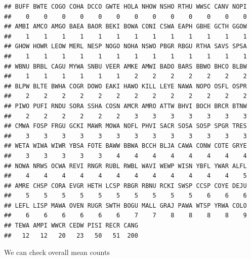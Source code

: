 \documentclass[12pt,]{book}
\newenvironment{Shaded}{\begin{snugshade}}{\end{snugshade}}
\newcommand{\DecValTok}[1]{\textcolor[rgb]{0.00,0.00,0.81}{#1}}
\newcommand{\KeywordTok}[1]{\textcolor[rgb]{0.13,0.29,0.53}{\textbf{#1}}}
\newcommand{\NormalTok}[1]{#1}
\newcommand{\OperatorTok}[1]{\textcolor[rgb]{0.81,0.36,0.00}{\textbf{#1}}}
\newcommand{\StringTok}[1]{\textcolor[rgb]{0.31,0.60,0.02}{#1}}
\begin{document}
\begin{verbatim}
## BUFF BWTE COGO COHA DCCO GWTE HOLA NHOW NSHO RTHU WWSC CANV NOPI 
##    0    0    0    0    0    0    0    0    0    0    0    0    0 
## AMBI AMCO AMGO BAEA BAOR BEKI BOWA CONI CSWA EAPH GBHE GCTH GGOW 
##    1    1    1    1    1    1    1    1    1    1    1    1    1 
## GHOW HOWR LEOW MERL NESP NOGO NOHA NSWO PBGR RBGU RTHA SAVS SPSA 
##    1    1    1    1    1    1    1    1    1    1    1    1    1 
## WBNU BRBL CAGU MYWA SNBU VEER AMKE AMWI BADO BARS BBWO BHCO BLBW 
##    1    1    1    1    1    1    2    2    2    2    2    2    2 
## BLPW BLTE BWHA COGR DOWO EAKI HAWO KILL LEYE NAWA NOPO OSFL OSPR 
##    2    2    2    2    2    2    2    2    2    2    2    2    2 
## PIWO PUFI RNDU SORA SSHA COSN AMCR AMRO ATTW BHVI BOCH BRCR BTNW 
##    2    2    2    2    2    2    3    3    3    3    3    3    3 
## CMWA FOSP FRGU GCKI MAWR MOWA NOFL PHVI SACR SOSA SOSP SPGR TRES 
##    3    3    3    3    3    3    3    3    3    3    3    3    3 
## WETA WIWA WIWR YBSA FOTE BAWW BBWA BCCH BLJA CAWA CONW COTE GRYE 
##    3    3    3    3    3    4    4    4    4    4    4    4    4 
## NOWA NRWS OCWA REVI RNGR RUBL RWBL WAVI WEWP WISN YBFL YWAR ALFL 
##    4    4    4    4    4    4    4    4    4    4    4    4    5 
## AMRE CHSP CORA EVGR HETH LCSP RBGR RBNU RCKI SWSP CCSP COYE DEJU 
##    5    5    5    5    5    5    5    5    5    5    6    6    6 
## LEFL LISP MAWA OVEN RUGR SWTH BOGU MALL GRAJ PAWA WTSP YRWA COLO 
##    6    6    6    6    6    6    7    7    8    8    8    8    9 
## TEWA AMPI WWCR CEDW PISI RECR CANG 
##   12   12   20   23   50   51  200
\end{verbatim}

\begin{Shaded}
\end{Shaded}

We can check overall mean counts
\end{document}

